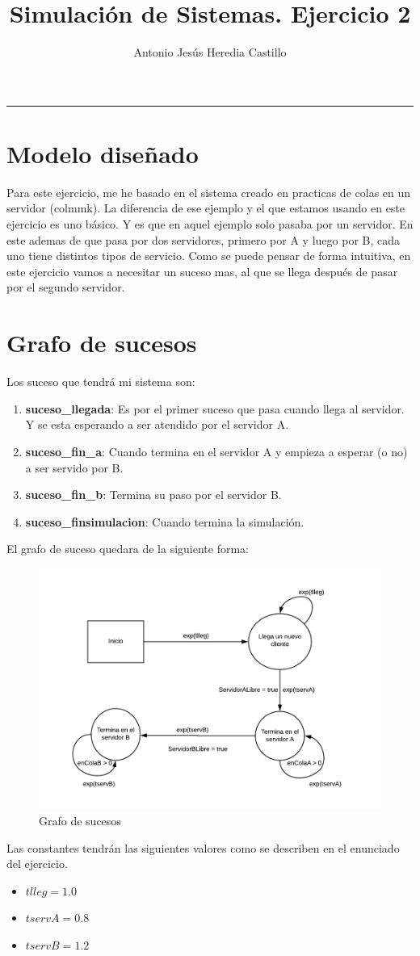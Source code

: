\documentclass[12pt,a4paper]{article}
\newcommand{\horrule}[1]{\rule{\linewidth}{#1}} %
\begin{document}
\title{Simulación de Sistemas. Ejercicio 2}

\author{
  Antonio Jesús Heredia Castillo\\
}

\date{}
\maketitle
\horrule{2pt}
\section{Modelo diseñado}
Para este ejercicio, me he basado en el sistema creado en practicas de colas en un servidor (colmmk). La diferencia de ese ejemplo y el que estamos usando en este ejercicio es uno básico.  Y es que en aquel ejemplo solo pasaba por un servidor. En este ademas de que pasa por dos servidores, primero por A y luego por B, cada uno tiene distintos tipos de servicio. Como se puede pensar de forma intuitiva, en este ejercicio vamos a necesitar un suceso mas, al que se llega después de pasar por el segundo servidor.
\section{Grafo de sucesos}

Los suceso que tendrá mi sistema son:
\begin{enumerate}
	\item \textbf{suceso\_llegada}: Es por el primer suceso que pasa cuando llega al servidor. Y se esta esperando a ser atendido por el servidor A.
	\item \textbf{suceso\_fin\_a}: Cuando termina en el servidor A y empieza a esperar (o no) a ser servido por B.
	\item \textbf{suceso\_fin\_b}: Termina su paso por el servidor B.
	\item \textbf{suceso\_finsimulacion}: Cuando termina la simulación.
\end{enumerate}
\newpage
El grafo de suceso quedara de la siguiente forma:
\begin{figure}[ph]
	\centering
	\includegraphics[width=0.7\linewidth]{./BlankDiagram.png}
	\caption{Grafo de sucesos}
	\label{fig:blank-diagram}
\end{figure}
Las constantes tendrán las siguientes valores como se describen en el enunciado del ejercicio.
\begin{itemize}
	\item $tlleg=1.0$
	\item $tservA=0.8$
	\item $tservB=1.2$	
\end{itemize}
\end{document}
